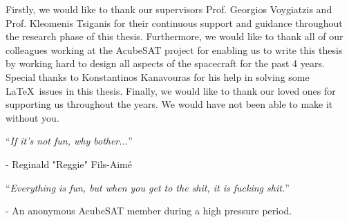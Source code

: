 \documentclass[
11pt, %
english, %
onehalfspacing, %
parskip, %
headsepline, %
]{MastersDoctoralThesis} %
\begin{document}

\begin{acknowledgements}
\addchaptertocentry{\acknowledgementname} %
Firstly, we would like to thank our supervisors Prof. Georgios Voygiatzis and Prof. Kleomenis Tsiganis for their continuous support and guidance throughout the research phase of this thesis. Furthermore, we would like to thank all of our colleagues working at the AcubeSAT project for enabling us to write this thesis by working hard to design all aspects of the spacecraft for the past 4 years. Special thanks to Konstantinos Kanavouras for his help in solving some \LaTeX\  issues in this thesis. Finally, we would like to thank our loved ones for supporting us throughout the years. We would have not been able to make it without you.

\vspace*{0.2\textheight}
\noindent\enquote{\itshape If it's not fun, why bother...}\bigbreak

\hfill - Reginald "Reggie" Fils-Aimé

\vspace*{0.1\textheight}

\noindent\enquote{\itshape Everything is fun, but when you get to the shit, it is fucking shit.}\bigbreak

\hfill - An anonymous AcubeSAT member during a high pressure period.

\end{acknowledgements}


\tableofcontents %

\listoffigures %

\listoftables %


\end{document}
